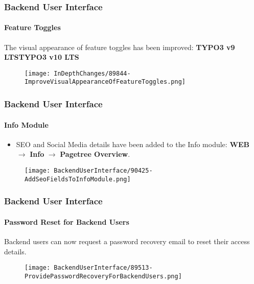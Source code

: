 
\begin{frame}[fragile]
	\frametitle{Backend User Interface}
	\framesubtitle{Feature Toggles}

	The visual appearance of feature toggles has been improved:
	\newline\newline
	\smaller\textbf{TYPO3 v9 LTS}\tabto{6cm}\textbf{TYPO3 v10 LTS}\normalsize

	\begin{figure}
		\texttt{[image: InDepthChanges/89844-ImproveVisualAppearanceOfFeatureToggles.png]}
	\end{figure}

\end{frame}


\begin{frame}[fragile]
	\frametitle{Backend User Interface}
	\framesubtitle{Info Module}

	\begin{itemize}
		\item SEO and Social Media details have been added to the Info module:\newline
			\textbf{WEB} $\rightarrow$ \textbf{Info} $\rightarrow$ \textbf{Pagetree Overview}.
	\end{itemize}

	\begin{figure}
		\texttt{[image: BackendUserInterface/90425-AddSeoFieldsToInfoModule.png]}
	\end{figure}

\end{frame}


\begin{frame}[fragile]
	\frametitle{Backend User Interface}
	\framesubtitle{Password Reset for Backend Users}

	Backend users can now request a password recovery email to reset their access details.

	\begin{figure}
		\texttt{[image: BackendUserInterface/89513-ProvidePasswordRecoveryForBackendUsers.png]}
	\end{figure}

\end{frame}

